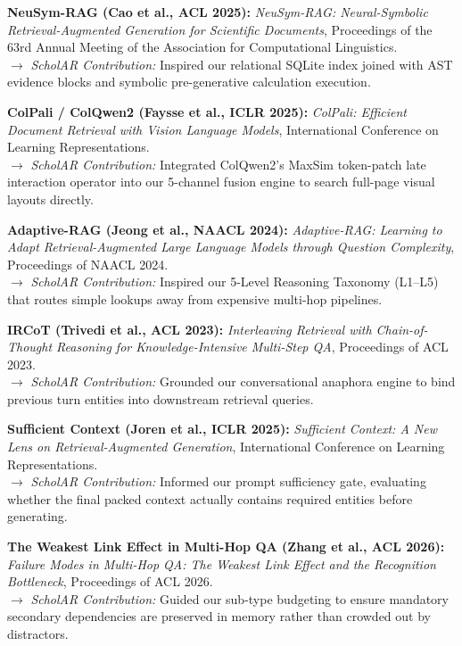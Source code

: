 \documentclass[11pt,a4paper]{article}
\begin{document}
\begin{enumerate}[leftmargin=*,label={[\arabic*]}]
    \item \textbf{NeuSym-RAG (Cao et al., ACL 2025):} \emph{NeuSym-RAG: Neural-Symbolic Retrieval-Augmented Generation for Scientific Documents}, Proceedings of the 63rd Annual Meeting of the Association for Computational Linguistics. \\
    $\rightarrow$ \emph{ScholAR Contribution:} Inspired our relational SQLite index joined with AST evidence blocks and symbolic pre-generative calculation execution.
    
    \item \textbf{ColPali / ColQwen2 (Faysse et al., ICLR 2025):} \emph{ColPali: Efficient Document Retrieval with Vision Language Models}, International Conference on Learning Representations. \\
    $\rightarrow$ \emph{ScholAR Contribution:} Integrated ColQwen2's MaxSim token-patch late interaction operator into our 5-channel fusion engine to search full-page visual layouts directly.
    
    \item \textbf{Adaptive-RAG (Jeong et al., NAACL 2024):} \emph{Adaptive-RAG: Learning to Adapt Retrieval-Augmented Large Language Models through Question Complexity}, Proceedings of NAACL 2024. \\
    $\rightarrow$ \emph{ScholAR Contribution:} Inspired our 5-Level Reasoning Taxonomy (L1--L5) that routes simple lookups away from expensive multi-hop pipelines.
    
    \item \textbf{IRCoT (Trivedi et al., ACL 2023):} \emph{Interleaving Retrieval with Chain-of-Thought Reasoning for Knowledge-Intensive Multi-Step QA}, Proceedings of ACL 2023. \\
    $\rightarrow$ \emph{ScholAR Contribution:} Grounded our conversational anaphora engine to bind previous turn entities into downstream retrieval queries.
    
    \item \textbf{Sufficient Context (Joren et al., ICLR 2025):} \emph{Sufficient Context: A New Lens on Retrieval-Augmented Generation}, International Conference on Learning Representations. \\
    $\rightarrow$ \emph{ScholAR Contribution:} Informed our prompt sufficiency gate, evaluating whether the final packed context actually contains required entities before generating.
    
    \item \textbf{The Weakest Link Effect in Multi-Hop QA (Zhang et al., ACL 2026):} \emph{Failure Modes in Multi-Hop QA: The Weakest Link Effect and the Recognition Bottleneck}, Proceedings of ACL 2026. \\
    $\rightarrow$ \emph{ScholAR Contribution:} Guided our sub-type budgeting to ensure mandatory secondary dependencies are preserved in memory rather than crowded out by distractors.
    

\end{enumerate}
\end{document}

